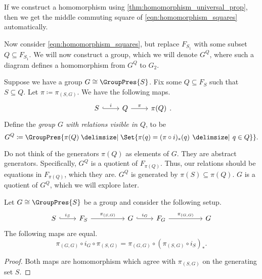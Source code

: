 \begin{remark}
	If we construct a homomorphism using \cref{thm:homomorphism_universal_prop}, then we get the middle commuting square of \eqref{eqn:homomorphism_squares} automatically.
	\label{rmk:universal_prop_homomorphism_gives_squares}
\end{remark}

Now consider \eqref{eqn:homomorphism_squares}, but replace $F_{S_1}$ with some subset $Q \subseteq F_{S_1}$.
We will now construct a group, which we will denote $G^Q$, where such a diagram defines a homomorphism from $G^Q$ to $G_2$.

\begin{definition}
	Suppose we have a group $G \cong \GroupPres{S}$.
	Fix some $Q \subseteq F_S$ such that $S \subseteq Q$.
	Let $\pi \coloneq \pi_{(S,G)}$.
	We have the following maps.
	\[
		\begin{tikzcd}
			S \ar[r, hook, "i"] & Q \ar[r, "\pi"] & \pi(Q)
		\end{tikzcd}
		.\]
	Define the \emph{group $G$ with relations visible in $Q$}, to be
	\[
		G^Q \coloneqq \GroupPres{\pi(Q) \relations \Set{\pi(q) = (\pi \circ i)_*(q) \given q \in Q} }
		.\]
	\label{def:G_Q}
\end{definition}

Do not think of  the generators $\pi(Q)$ as elements of $G$.
They are abstract generators.
Specifically,  $G^Q$ is a quotient of  $F_{\pi(Q)}$.
Thus, our relations should be equations in $F_{\pi(Q)}$, which they are.
$G^Q$ is generated by $\pi(S) \subseteq \pi(Q)$.
$G$ is a quotient of  $G^Q$, which we will explore later.

\begin{lemma}
	Let $G \cong \GroupPres{S}$ be a group and consider the following setup.
	\[
		\begin{tikzcd}
			S \ar[r, hook, "i_S"] & F_S \ar[rr, "\pi_{(S,G)}"] & & G \ar[r, hook, "i_G"] & F_G \ar[rr, "\pi_{(G,G)}"] & & G
		\end{tikzcd}
	\]
	The following maps are equal.
	\[
		\pi_{(G,G)} \circ i_G \circ \pi_{(S,G)} = \pi_{(G,G)} \circ (\pi_{(S,G)} \circ i_S)_*
		.\]
	\label{lem:group_projections}
\end{lemma}

\begin{proof}
	Both maps are homomorphism which agree with $\pi_{\left( S,G\right)}$ on the generating set $S$.
\end{proof}

